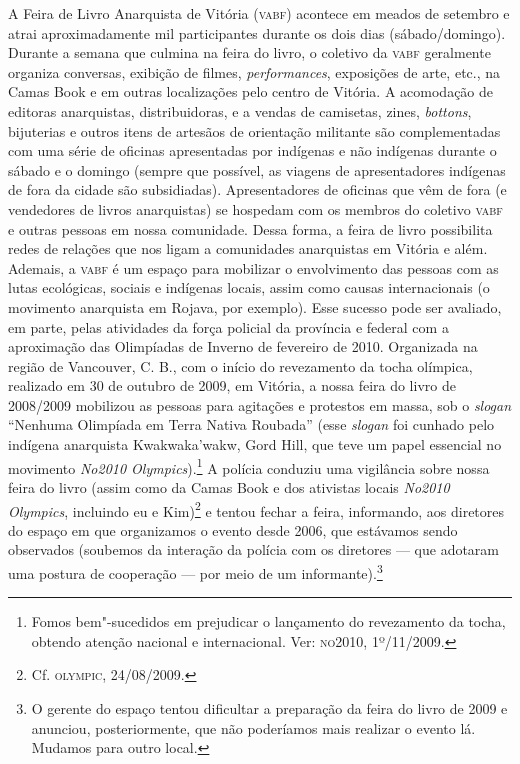 A Feira de Livro Anarquista de Vitória (\textsc{vabf}) acontece em meados de
setembro e atrai aproximadamente mil participantes durante os dois dias
(sábado/domingo). Durante a semana que culmina na feira do livro, o
coletivo da \textsc{vabf} geralmente organiza conversas, exibição de filmes,
\emph{performances}, exposições de arte, etc., na Camas Book e em outras
localizações pelo centro de Vitória. A acomodação de editoras
anarquistas, distribuidoras, e a vendas de camisetas, zines,
\emph{bottons}, bijuterias e outros itens de artesãos de orientação
militante são complementadas com uma série de oficinas apresentadas por
indígenas e não indígenas durante o sábado e o domingo (sempre que
possível, as viagens de apresentadores indígenas de fora da cidade são
subsidiadas). Apresentadores de oficinas que vêm de fora (e vendedores
de livros anarquistas) se hospedam com os membros do coletivo \textsc{vabf} e
outras pessoas em nossa comunidade. Dessa forma, a feira de livro
possibilita redes de relações que nos ligam a comunidades anarquistas em
Vitória e além. Ademais, a \textsc{vabf} é um espaço para mobilizar o
envolvimento das pessoas com as lutas ecológicas, sociais e indígenas
locais, assim como causas internacionais (o movimento anarquista em
Rojava, por exemplo). Esse sucesso pode ser avaliado, em parte, pelas
atividades da força policial da província e federal com a aproximação
das Olimpíadas de Inverno de fevereiro de 2010. Organizada na região de
Vancouver, C. B., com o início do revezamento da tocha olímpica,
realizado em 30 de outubro de 2009, em Vitória, a nossa feira do livro
de 2008/2009 mobilizou as pessoas para agitações e protestos em massa,
sob o \emph{slogan} ``Nenhuma Olimpíada em Terra Nativa Roubada'' (esse
\emph{slogan} foi cunhado pelo indígena anarquista Kwakwaka'wakw, Gord
Hill, que teve um papel essencial no movimento \emph{No2010
Olympics}).\footnote{Fomos bem"-sucedidos em prejudicar o lançamento do
  revezamento da tocha, obtendo atenção nacional e internacional. Ver:
  \textsc{no}2010, 1º/11/2009.} A polícia conduziu uma vigilância sobre nossa
feira do livro (assim como da Camas Book e dos ativistas locais
\emph{No2010 Olympics}, incluindo eu e Kim)\footnote{Cf. \textsc{olympic},
  24/08/2009.} e tentou fechar a feira, informando, aos diretores do
espaço em que organizamos o evento desde 2006, que estávamos sendo
observados (soubemos da interação da polícia com os diretores --- que
adotaram uma postura de cooperação --- por meio de um
informante).\footnote{O gerente do espaço tentou dificultar a preparação
  da feira do livro de 2009 e anunciou, posteriormente, que não
  poderíamos mais realizar o evento lá. Mudamos para outro local.}

